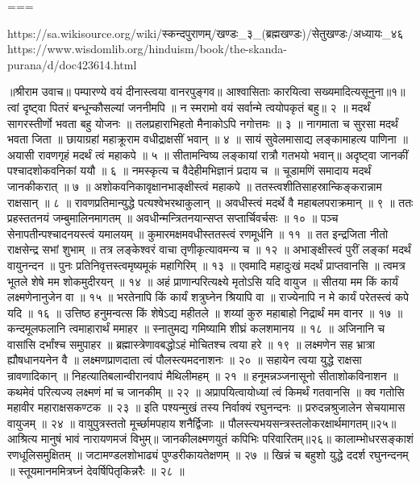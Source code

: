 ===

https://sa.wikisource.org/wiki/स्कन्दपुराणम्/खण्डः_३_(ब्रह्मखण्डः)/सेतुखण्डः/अध्यायः_४६
https://www.wisdomlib.org/hinduism/book/the-skanda-purana/d/doc423614.html

॥श्रीराम उवाच॥
पम्पारण्ये वयं दीनास्त्वया वानरपुङ्गव॥
आश्वासिताः कारयित्वा सख्यमादित्यसूनुना॥१॥
त्वां दृष्ट्वा पितरं बन्धून्कौसल्यां जननीमपि ॥
न स्मरामो वयं सर्वान्मे त्वयोपकृतं बहु॥ २ ॥
मदर्थं सागरस्तीर्णो भवता बहु योजनः ॥
तलप्रहाराभिहतो मैनाकोऽपि नगोत्तमः ॥ ३ ॥
नागमाता च सुरसा मदर्थं भवता जिता ॥
छायाग्रहां महाक्रूराम वधीद्राक्षसीं भवान् ॥ ४ ॥
सायं सुवेलमासाद्य लङ्कामाहत्य पाणिना ॥
अयासी रावणगृहं मदर्थं त्वं महाकपे ॥ ५ ॥
सीतामन्विष्य लङ्कायां रात्रौ गतभयो भवान्॥
अदृष्ट्वा जानकीं पश्चादशोकवनिकां ययौ ॥ ६ ॥
नमस्कृत्य च वैदेहीमभिज्ञानं प्रदाय च ॥
चूडामणिं समादाय मदर्थं जानकीकरात् ॥ ७ ॥
अशोकवनिकावृक्षानभाङ्क्षीस्त्वं महाकपे ॥
ततस्त्वशीतिसाहस्रान्किङ्करान्नाम राक्षसान् ॥ ८ ॥
रावणप्रतिमान्युद्धे पत्यश्वेभरथाकुलान् ॥
अवधीस्त्वं मदर्थे वै महाबलपराक्रमान् ॥ ९ ॥
ततः प्रहस्ततनयं जम्बुमालिनमागतम् ॥
अवधीन्मन्त्रितनयान्सप्त सप्तार्चिवर्चसः ॥ १० ॥
पञ्च सेनापतीन्पश्चादनयस्त्वं यमालयम् ॥
कुमारमक्षमवधीस्ततस्त्वं रणमूर्धनि ॥ ११ ॥
तत इन्द्रजिता नीतो राक्षसेन्द्र सभां शुभाम् ॥
तत्र लङ्केश्वरं वाचा तृणीकृत्यावमन्य च ॥ १२ ॥
अभाङ्क्षीस्त्वं पुरीं लङ्कां मदर्थं वायुनन्दन ॥
पुनः प्रतिनिवृत्तस्त्वमृष्यमूकं महागिरिम् ॥ १३ ॥
एवमादि महादुःखं मदर्थं प्राप्तवानसि ॥
त्वमत्र भूतले शेषे मम शोकमुदीरयन् ॥ १४ ॥
अहं प्राणान्परित्यक्ष्ये मृतोऽसि यदि वायुज ॥
सीतया मम किं कार्यं लक्ष्मणेनानुजेन वा ॥ १५ ॥
भरतेनापि किं कार्यं शत्रुघ्नेन श्रियापि वा ॥
राज्येनापि न मे कार्यं परेतस्त्वं कपे यदि ॥ १६ ॥
उत्तिष्ठ हनुमन्वत्स किं शेषेऽद्य महीतले ॥
शय्यां कुरु महाबाहो निद्रार्थं मम वानर ॥ १७ ॥
कन्दमूलफलानि त्वमाहारार्थं ममाहर ॥
स्नातुमद्य गमिष्यामि शीघ्रं कलशमानय ॥ १८ ॥
अजिनानि च वासांसि दर्भांश्च समुपाहर ॥
ब्रह्मास्त्रेणावबद्धोऽहं मोचितश्च त्वया हरे ॥ १९ ॥
लक्ष्मणेन सह भ्रात्रा ह्यौषधानयनेन वै ॥
लक्ष्मणप्राणदाता त्वं पौलस्त्यमदनाशनः ॥ २० ॥
सहायेन त्वया युद्धे राक्षसा न्रावणादिकान् ॥
निहत्यातिबलान्वीरानवापं मैथिलीमहम् ॥ २१ ॥
हनूमन्नञ्जनासूनो सीताशोकविनाशन ॥
कथमेवं परित्यज्य लक्ष्मणं मां च जानकीम् ॥ २२ ॥
अप्रापयित्वायोध्यां त्वं किमर्थं गतवानसि ॥
क्व गतोसि महावीर महाराक्षसकण्टक ॥ २३ ॥
इति पश्यन्मुखं तस्य निर्वाक्यं रघुनन्दनः ॥
प्ररुदन्नश्रुजालेन सेचयामास वायुजम् ॥ २४ ॥
वायुपुत्रस्ततो मूर्च्छामपहाय शनैर्द्विजाः ॥
पौलस्त्यभयसन्त्रस्तलोकरक्षार्थमागतम्॥२५॥
आश्रित्य मानुषं भावं नारायणमजं विभुम्॥
जानकीलक्ष्मणयुतं कपिभिः परिवारितम्॥२६॥
कालाम्भोधरसङ्काशं रणधूलिसमुक्षितम् ॥
जटामण्डलशोभाढ्यं पुण्डरीकायतेक्षणम् ॥ २७ ॥
खिन्नं च बहुशो युद्धे ददर्श रघुनन्दनम् ॥
स्तूयमानममित्रघ्नं देवर्षिपितृकिन्नरैः ॥ २८ ॥
